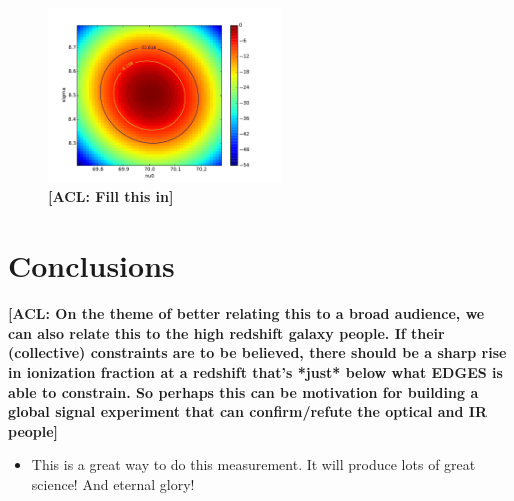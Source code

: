 \documentclass[twolcolumn,apj]{emulateapj}
\newcommand{\acl}[1]{{\color{red} \textbf{[ACL:  #1]}}}
\begin{document}
\begin{figure}[h]
	\centering
	\includegraphics[width=0.55\textwidth]{figures/contours_nu0_sigma.pdf}
	\caption{\acl{Fill this in}}
\end{figure}

\section{Conclusions}
\label{sec:Conc}
\acl{On the theme of better relating this to a broad audience, we can also relate this to the high redshift galaxy people.  If their (collective) constraints are to be believed, there should be a sharp rise in ionization fraction at a redshift that's *just* below what EDGES is able to constrain.  So perhaps this can be motivation for building a global signal experiment that can confirm/refute the optical and IR people}
\begin{itemize}
\item This is a great way to do this measurement.  It will produce lots of great science! And eternal glory!
\end{itemize}


{}
\end{document}
